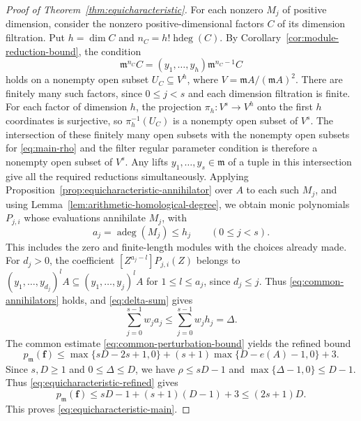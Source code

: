 \documentclass[11pt,reqno]{amsart}
\numberwithin{equation}{section}
\theoremstyle{definition}
\newcommand{\m}{\mathfrak m}
\newcommand{\f}{\mathbf f}
\newcommand{\hdeg}{\operatorname{hdeg}}
\newcommand{\adeg}{\operatorname{adeg}}
\begin{document}
\begin{proof}[Proof of Theorem~\ref{thm:equicharacteristic}]
For each nonzero $M_j$ of positive dimension, consider the
nonzero positive-dimensional factors $C$ of its dimension
filtration. Put $h=\dim C$ and $n_C=h!\hdeg(C)$.
By Corollary~\ref{cor:module-reduction-bound}, the condition
\[
 \m^{n_C}C=(y_1,\ldots,y_h)\m^{n_C-1}C
\]
holds on a nonempty open subset $U_C\subseteq V^h$, where
$V=\m A/(\m A)^2$.
There are finitely many such factors, since $0\le j<s$ and each
dimension filtration is finite.
For each factor of dimension $h$, the projection
$\pi_h:V^s\to V^h$ onto the first $h$ coordinates is surjective,
so $\pi_h^{-1}(U_C)$ is a nonempty open subset of $V^s$.
The intersection of these finitely many open subsets with the
nonempty open subsets for \eqref{eq:main-rho} and the filter regular
parameter condition is therefore a nonempty open subset of $V^s$.
Any lifts $y_1,\ldots,y_s\in\m$ of a tuple in this intersection
give all the required reductions simultaneously.
Applying Proposition~\ref{prop:equicharacteristic-annihilator} over $A$
to each such $M_j$, and using
Lemma~\ref{lem:arithmetic-homological-degree}, we obtain monic
polynomials $P_{j,i}$ whose evaluations annihilate $M_j$, with
\begin{equation}\label{eq:a-j-equicharacteristic}
 a_j=\adeg(M_j)\le h_j\qquad(0\le j<s).
\end{equation}
This includes the zero and finite-length modules with the choices
already made. For $d_j>0$, the coefficient $[Z^{a_j-l}]P_{j,i}(Z)$ belongs to
$(y_1,\ldots,y_{d_j})^lA\subseteq(y_1,\ldots,y_j)^lA$
for $1\le l\le a_j$, since $d_j\le j$. Thus \eqref{eq:common-annihilators} holds, and
\eqref{eq:delta-sum} gives
\[
 \sum_{j=0}^{s-1}w_ja_j\le\sum_{j=0}^{s-1}w_jh_j=\Delta.
\]
The common estimate \eqref{eq:common-perturbation-bound} yields
the refined bound
\begin{equation}\label{eq:equicharacteristic-refined}
 p_{\m}(\f)\le
 \max\{sD-2s+1,0\}+(s+1)\max\{D-e(A)-1,0\}+3.
\end{equation}
Since $s,D\ge1$ and $0\le\Delta\le D$, we have
$\rho\le sD-1$ and $\max\{\Delta-1,0\}\le D-1$.
Thus \eqref{eq:equicharacteristic-refined} gives
\[
 p_{\m}(\f)\le sD-1+(s+1)(D-1)+3\le(2s+1)D.
\]
This proves \eqref{eq:equicharacteristic-main}.
\end{proof}
\end{document}
